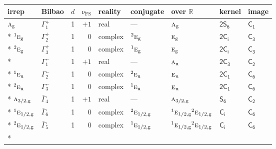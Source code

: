 \documentclass[10pt,a4paper]{article}
\makeatletter
\def\grouprule#1#2{\noalign{\marks\LTgroupmarks{\the\belowrulesep}\nobreak\vskip#1%
  \vskip\aboverulesep}\multispan\LT@cols\unskip{\leaders\hrule\@height#2\hfill\kern\z@}\cr
  \noalign{\penalty\LTrulebreak\vskip\belowrulesep\global\@lastruleclass\z@}}
\numberwithin{equation}{section}
\newcommand{\grp}[1]{\mathsf{#1}}
\newcommand{\irr}[1]{\text{\normalfont\scshape #1}}
\newcommand{\conjpair}[1]{{}^{#1}}
\newcommand{\detbox}[1]{{\setlength{\fboxsep}{1pt}\fbox{#1}}}
\newcommand{\ptag}[1]{\mathrm{#1}}
\newcommand{\fsind}{\nu_{\mathrm{FS}}}
\makeatother
\begin{document}
{\small\renewcommand{\arraystretch}{1.25}\setlength{\tabcolsep}{4pt}\begin{longtable}{@{}llrrlllll@{}}\toprule
irrep & Bilbao & $d$ & $\fsind$ & reality & conjugate & over $\mathbb{R}$ & kernel & image\\\midrule\endhead
\bottomrule\endfoot\endlastfoot
$\irr{a}_{\ptag{g}}$ & $\Gamma_{1}^{+}$ & 1 & $+1$ & real & --- & $\irr{a}_{\ptag{g}}$ & \href{2S6.pdf}{$\grp{2S_{6}}$} & \href{../../../rotation/data/pdf/C1.pdf}{$\grp{C_{1}}$}\\*
$\conjpair{1}\irr{e}_{\ptag{g}}$ & $\Gamma_{2}^{+}$ & 1 & $0$ & complex & $\conjpair{2}\irr{e}_{\ptag{g}}$ & $\irr{e}_{\ptag{g}}$ & \href{2S2.pdf}{$\grp{2C_{i}}$} & \href{../../../rotation/data/pdf/C3.pdf}{$\grp{C_{3}}$}\\*
$\conjpair{2}\irr{e}_{\ptag{g}}$ & $\Gamma_{3}^{+}$ & 1 & $0$ & complex & $\conjpair{1}\irr{e}_{\ptag{g}}$ & $\irr{e}_{\ptag{g}}$ & \href{2S2.pdf}{$\grp{2C_{i}}$} & \href{../../../rotation/data/pdf/C3.pdf}{$\grp{C_{3}}$}\\*
\detbox{$\irr{a}_{\ptag{u}}$} & $\Gamma_{1}^{-}$ & 1 & $+1$ & real & --- & $\irr{a}_{\ptag{u}}$ & \href{2C3.pdf}{$\grp{2C_{3}}$} & \href{../../../rotation/data/pdf/C2.pdf}{$\grp{C_{2}}$}\\*
$\conjpair{1}\irr{e}_{\ptag{u}}$ & $\Gamma_{2}^{-}$ & 1 & $0$ & complex & $\conjpair{2}\irr{e}_{\ptag{u}}$ & $\irr{e}_{\ptag{u}}$ & \href{2C1.pdf}{$\grp{2C_{1}}$} & \href{../../../rotation/data/pdf/C6.pdf}{$\grp{C_{6}}$}\\*
$\conjpair{2}\irr{e}_{\ptag{u}}$ & $\Gamma_{3}^{-}$ & 1 & $0$ & complex & $\conjpair{1}\irr{e}_{\ptag{u}}$ & $\irr{e}_{\ptag{u}}$ & \href{2C1.pdf}{$\grp{2C_{1}}$} & \href{../../../rotation/data/pdf/C6.pdf}{$\grp{C_{6}}$}\\*
\grouprule{0pt}{\lightrulewidth}
$\irr{a}_{3/2,\ptag{g}}$ & $\bar{\Gamma}_{4}$ & 1 & $+1$ & real & --- & $\irr{a}_{3/2,\ptag{g}}$ & \href{S6.pdf}{$\grp{S_{6}}$} & \href{../../../rotation/data/pdf/C2.pdf}{$\grp{C_{2}}$}\\*
$\conjpair{1}\irr{e}_{1/2,\ptag{g}}$ & $\bar{\Gamma}_{6}$ & 1 & $0$ & complex & $\conjpair{2}\irr{e}_{1/2,\ptag{g}}$ & $\conjpair{1}\irr{e}_{1/2,\ptag{g}}\conjpair{2}\irr{e}_{1/2,\ptag{g}}$ & \href{S2.pdf}{$\grp{C_{i}}$} & \href{../../../rotation/data/pdf/C6.pdf}{$\grp{C_{6}}$}\\*
$\conjpair{2}\irr{e}_{1/2,\ptag{g}}$ & $\bar{\Gamma}_{5}$ & 1 & $0$ & complex & $\conjpair{1}\irr{e}_{1/2,\ptag{g}}$ & $\conjpair{1}\irr{e}_{1/2,\ptag{g}}\conjpair{2}\irr{e}_{1/2,\ptag{g}}$ & \href{S2.pdf}{$\grp{C_{i}}$} & \href{../../../rotation/data/pdf/C6.pdf}{$\grp{C_{6}}$}\\*

\end{longtable}}
\end{document}
